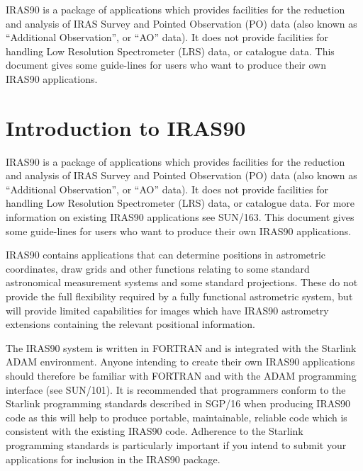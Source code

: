 \documentclass[twoside,11pt]{article}
\newcommand{\stardocinitials}  {SUN}
\newcommand{\stardocnumber}    {165.4}
\newcommand{\stardocabstract}  {
{\small IRAS90} is a package of applications which provides facilities
for the reduction and analysis of {\small IRAS} Survey and Pointed
Observation (PO) data (also known as ``Additional Observation'', or
``AO'' data). It does not provide facilities for handling Low
Resolution Spectrometer (LRS) data, or catalogue data.
This document gives some guide-lines for users who want to produce their own
{\small IRAS90} applications.
}
\newcommand{\stardocname}{\stardocinitials /\stardocnumber}
\newenvironment{latexonly}{}{}
\newcommand{\xref}[3]{#1}
\newcommand{\xlabel}[1]{}
\renewcommand{\thepage}{\roman{page}}
\begin{document}
\stardocabstract
\newpage
\begin{latexonly}
   \setlength{\parskip}{0mm}
   \tableofcontents
   \setlength{\parskip}{\medskipamount}
   \markright{\stardocname}
\end{latexonly}
\newpage
\renewcommand{\thepage}{\arabic{page}}
\setcounter{page}{1}

\section{Introduction to IRAS90\xlabel{introduction_to_iras90}}

{\small IRAS90} is a package of applications which provides facilities
for the reduction and analysis of {\small IRAS} Survey and Pointed
Observation (PO) data (also known as ``Additional Observation'', or
``AO'' data). It does not provide facilities for handling Low
Resolution Spectrometer (LRS) data, or catalogue data. For more
information on existing {\small IRAS90} applications see
\xref{SUN/163}{sun163}{}.  This
document gives some guide-lines for users who want to produce their own
{\small IRAS90} applications.

{\small IRAS90} contains applications that can determine positions in
astrometric coordinates, draw grids and other functions relating to some
standard astronomical measurement systems and some standard projections. These
do not provide the full flexibility required by a fully functional astrometric
system, but will provide limited capabilities for images which have {\small
IRAS90} astrometry extensions containing the relevant positional information.

The {\small IRAS90} system is written in {\small FORTRAN} and is
integrated with the Starlink {\small ADAM} environment. Anyone
intending to create their own {\small IRAS90} applications should
therefore be familiar with {\small FORTRAN} and with the {\small ADAM}
programming interface
(see \xref{SUN/101}{sun101}{}). It is recommended that programmers
conform to the Starlink programming standards described in
\xref{SGP/16}{sgp16}{} when
producing {\small IRAS90} code as this will help to produce portable,
maintainable, reliable code which is consistent with the existing
{\small IRAS90} code. Adherence to the Starlink programming standards
is particularly important if you intend to submit your applications for
inclusion in the {\small IRAS90} package.
\end{document}

